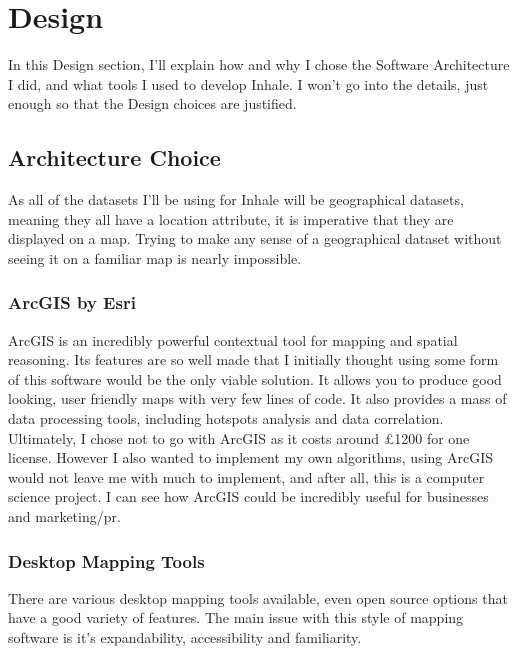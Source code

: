 \chapter{Design}
\label{cha:des}
In this Design section, I'll explain how and why I chose the Software Architecture I did, and what tools I used to develop Inhale. I won't go into the details, just enough so that the Design choices are justified.

\section{Architecture Choice}

As all of the datasets I'll be using for Inhale will be geographical datasets, meaning they all have a location attribute, it is imperative that they are displayed on a map. Trying to make any sense of a geographical dataset without seeing it on a familiar map is nearly impossible.\\



\subsection{ArcGIS by Esri}

ArcGIS is an incredibly powerful contextual tool for mapping and spatial reasoning. Its features are so well made that I initially thought using some form of this software would be the only viable solution. It allows you to produce good looking, user friendly maps with very few lines of code. It  also provides a mass of data processing tools, including hotspots analysis and data correlation.\\

Ultimately, I chose not to go with ArcGIS as it costs around £1200 for one license. However I also wanted to implement my own algorithms, using ArcGIS would not leave me with much to implement, and after all, this is a computer science project. I can see how ArcGIS could be incredibly useful for businesses and marketing/pr.

\subsection{Desktop Mapping Tools}

There are various desktop mapping tools available, even open source options that have a good variety of features. The main issue with this style of mapping software is it's expandability, accessibility and familiarity.\\

